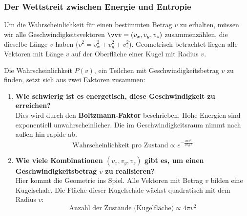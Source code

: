 \subsubsection*{Der Wettstreit zwischen Energie und Entropie}
Um die Wahrscheinlichkeit für einen bestimmten Betrag $v$ zu erhalten, müssen wir alle Geschwindigkeitsvektoren $\ivec{v}=(v_x, v_y, v_z)$ zusammenzählen, die dieselbe Länge $v$ haben ($v^2 = v_x^2 + v_y^2 + v_z^2$).
Geometrisch betrachtet liegen alle Vektoren mit Länge $v$ auf der Oberfläche einer Kugel mit Radius $v$.

Die Wahrscheinlichkeit $P(v)$, ein Teilchen mit Geschwindigkeitsbetrag $v$ zu finden, setzt sich aus zwei Faktoren zusammen:
\begin{enumerate}
    \item \textbf{Wie schwierig ist es energetisch, diese Geschwindigkeit zu erreichen?} \\
    Dies wird durch den \textbf{Boltzmann-Faktor} beschrieben. Hohe Energien sind exponentiell unwahrscheinlicher. Die  im Geschwindigkeitsraum nimmt nach außen hin rapide ab.
    \begin{equation*}
        \text{Wahrscheinlichkeit pro Zustand} \propto e^{-\frac{m v^2}{2 k_B T}}
    \end{equation*}
    
    \item \textbf{Wie viele Kombinationen $(v_x, v_y, v_z)$ gibt es, um einen Geschwindigkeitsbetrag $v$ zu realisieren?} \\
    Hier kommt die Geometrie ins Spiel. Alle Vektoren mit Betrag $v$ bilden eine Kugelschale. Die Fläche dieser Kugelschale wächst quadratisch mit dem Radius $v$:
    \begin{equation*}
        \text{Anzahl der Zustände (Kugelfläche)} \propto 4\pi v^2
    \end{equation*}
\end{enumerate}



